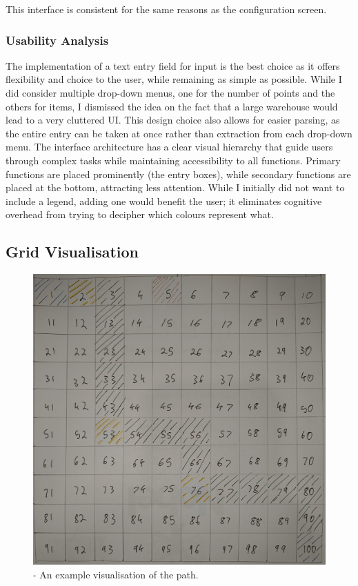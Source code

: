 This interface is consistent for the same reasons as the configuration screen.

\subsubsection{Usability Analysis}
The implementation of a text entry field for input is the best choice as it offers flexibility and choice to the user, while remaining as simple as possible. While I did consider multiple drop-down menus, one for the number of points and the others for items, I dismissed the idea on the fact that a large warehouse would lead to a very cluttered UI. This design choice also allows for easier parsing, as the entire entry can be taken at once rather than extraction from each drop-down menu. \newline The interface architecture has a clear visual hierarchy that guide users through complex tasks while maintaining accessibility to all functions. Primary functions are placed prominently (the entry boxes), while secondary functions are placed at the bottom, attracting less attention. \newline
While I initially did not want to include a legend, adding one would benefit the user; it eliminates cognitive overhead from trying to decipher which colours represent what.

\newpage

\subsection{Grid Visualisation}

\begin{figure}[!htbp]
    \centering
    \includegraphics[width=0.6\linewidth]{gridvisual.jpg}
    \caption{- An example visualisation of the path.}
\end{figure}

